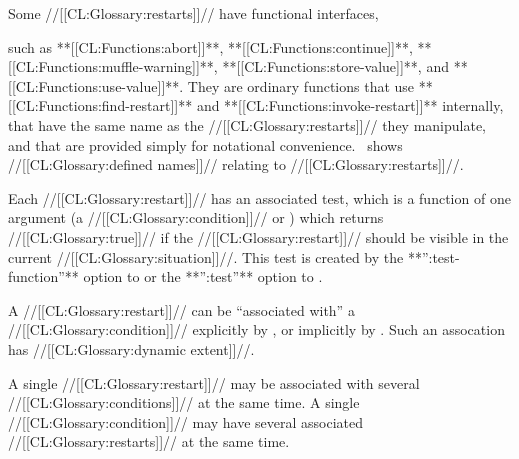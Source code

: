   \endsubsubsubsection%
 

Some //[[CL:Glossary:restarts]]// have functional interfaces, 

such as **[[CL:Functions:abort]]**, **[[CL:Functions:continue]]**,  **[[CL:Functions:muffle-warning]]**, **[[CL:Functions:store-value]]**, and  **[[CL:Functions:use-value]]**. They are ordinary functions that use 
 **[[CL:Functions:find-restart]]** and **[[CL:Functions:invoke-restart]]** internally, that have the same name as the //[[CL:Glossary:restarts]]// they manipulate, and that are provided simply for notational convenience.
  \Thenextfigure\ shows //[[CL:Glossary:defined names]]// relating to //[[CL:Glossary:restarts]]//.

  \endsubsubsubsection%



Each //[[CL:Glossary:restart]]// has an associated test, which is a function of one argument (a //[[CL:Glossary:condition]]// or \nil) which returns //[[CL:Glossary:true]]// if the //[[CL:Glossary:restart]]// should be visible in the current //[[CL:Glossary:situation]]//.  This test is created by  the **'':test-function''** option to  or  the **'':test''** option to .

\endsubsubsubsection%

 

 A //[[CL:Glossary:restart]]// can be ``associated with'' a //[[CL:Glossary:condition]]// explicitly by , or implicitly by . Such an assocation has //[[CL:Glossary:dynamic extent]]//.

A single //[[CL:Glossary:restart]]// may be associated with several //[[CL:Glossary:conditions]]//  at the same time. A single //[[CL:Glossary:condition]]// may have several associated //[[CL:Glossary:restarts]]// at the same time.

